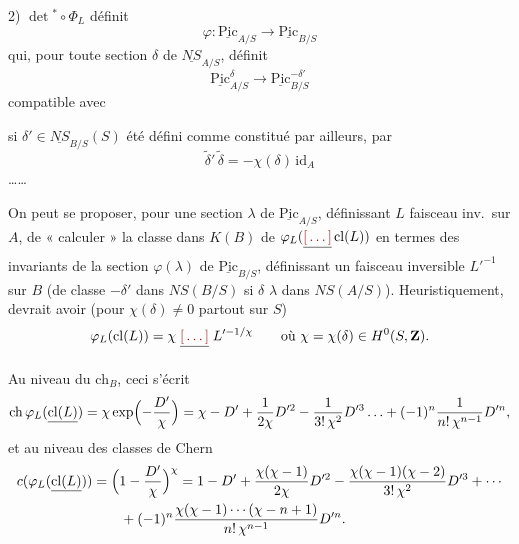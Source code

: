 \documentclass[11pt,a4paper]{article}
\begin{document}
2) $\det{}^{*} \circ \Phi_L$ définit 
\[
  \varphi \colon \underline{\mathrm{Pic}}_{A/S} \longrightarrow \underline{\mathrm{Pic}}_{B/S}
\]
qui, pour toute section $\delta$ de $\underline{NS}_{A/S}$,
définit
\[
  \underline{\mathrm{Pic}}^{\delta}_{A/S} \longrightarrow \underline{\mathrm{Pic}}^{-\delta'}_{B/S}
\]
compatible avec 


si $\delta' \in \underline{NS}_{B/S}(S)$ été défini comme \ill{}
constitué par ailleurs, par
\[
  \tilde\delta{}'\, \tilde\delta = -\chi(\delta)\, \mathrm{id}_A
\]
\ldots\ldots

On peut se proposer, pour une section $\lambda$ de $\underline{\mathrm{Pic}}_{A/S}$,
définissant $L$ faisceau inv.\ sur $A$, de « calculer » la classe dans $K(B)$
de $\varphi_L(\struck{\ill{}}\, \mathrm{cl}(L))$ en termes des invariants de
la section $\varphi(\lambda)$ de $\underline{\mathrm{Pic}}_{B/S}$, définissant
un faisceau inversible $L'^{-1}$ sur $B$ (de classe $-\delta'$ dans
$NS(B/S)$ si $\delta$  $\lambda$ dans $NS(A/S)$).
Heuristiquement, \struck{\ill{}} devrait avoir (pour $\chi(\delta) \neq 0$
partout sur $S$)
\[
  \varphi_L(\mathrm{cl}(L)) = \chi\; \struck{\ill{}}\; L'^{-1/\chi}
  \qquad \text{où } \chi = \chi(\delta) \in H^{0}(S, \mathbf{Z}).
\]



Au niveau du $\mathrm{ch}_B$, ceci s'écrit
\[
  \mathrm{ch}\, \varphi_L(\uncertain{\mathrm{cl}(L)}) = \chi \exp\Bigl(-\frac{D'}{\chi}\Bigr)
  = \chi - D' + \frac{1}{2\chi} D'^{2} - \frac{1}{3!\,\chi^{2}} D'^{3} \ldots
  + (-1)^n \frac{1}{n!\,\chi^{n-1}} D'^{n},
\]
et au niveau des classes de Chern \struck{\ill{}}
\begin{align*}
  c(\varphi_L(\uncertain{\mathrm{cl}(L)})) &= \Bigl(1 - \frac{D'}{\chi}\Bigr)^{\chi}
  = 1 - D' + \frac{\chi(\chi-1)}{2\chi} D'^{2} - \frac{\chi(\chi-1)(\chi-2)}{3!\,\chi^{2}} D'^{3} + \cdots \\
  &\qquad + (-1)^n \frac{\chi(\chi-1)\cdots(\chi-n+1)}{n!\,\chi^{n-1}} D'^{n}.
\end{align*}

\end{document}
